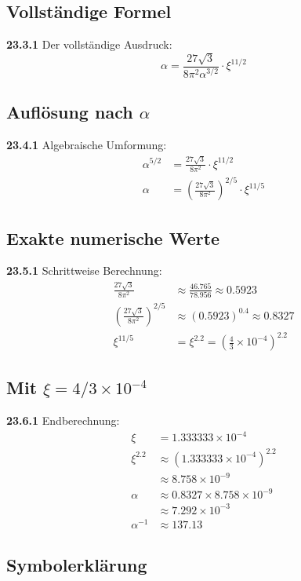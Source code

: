 \documentclass[12pt,a4paper]{article}
\begin{document}
\subsection{Vollständige Formel}
\noindent \textbf{23.3.1} Der vollständige Ausdruck:
\begin{equation}
	\alpha = \frac{27\sqrt{3}}{8\pi^2\alpha^{3/2}} \cdot \xi^{11/2}
\end{equation}

\subsection{Auflösung nach $\alpha$}
\noindent \textbf{23.4.1} Algebraische Umformung:
\begin{align}
	\alpha^{5/2} &= \frac{27\sqrt{3}}{8\pi^2} \cdot \xi^{11/2} \\
	\alpha &= \left(\frac{27\sqrt{3}}{8\pi^2}\right)^{2/5} \cdot \xi^{11/5}
\end{align}

\subsection{Exakte numerische Werte}
\noindent \textbf{23.5.1} Schrittweise Berechnung:
\begin{align}
	\frac{27\sqrt{3}}{8\pi^2} &\approx \frac{46.765}{78.956} \approx 0.5923 \\
	\left(\frac{27\sqrt{3}}{8\pi^2}\right)^{2/5} &\approx (0.5923)^{0.4} \approx 0.8327 \\
	\xi^{11/5} &= \xi^{2.2} = \left(\frac{4}{3} \times 10^{-4}\right)^{2.2}
\end{align}

\subsection{Mit $\xi = 4/3 \times 10^{-4}$}
\noindent \textbf{23.6.1} Endberechnung:
\begin{align}
	\xi &= 1.333333 \times 10^{-4} \\
	\xi^{2.2} &\approx (1.333333 \times 10^{-4})^{2.2} \\
	&\approx 8.758 \times 10^{-9} \\
	\alpha &\approx 0.8327 \times 8.758 \times 10^{-9} \\
	&\approx 7.292 \times 10^{-3} \\
	\alpha^{-1} &\approx 137.13
\end{align}

\subsection{Symbolerklärung}
\end{document}
